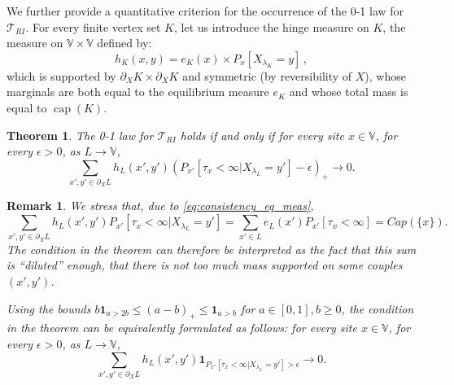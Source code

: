 \documentclass[12pt,a4paper]{article}
\newtheorem{theorem}[theo]{Theorem}
\newtheorem{remark}[theo]{Remark}
\newcommand{\1}[1]{{\mathbf 1}{\{#1\}}}
\newcommand{\8}{{\infty}}
\newcommand{\ind}{{\mathbf{1}}} %
\newcommand{\capa}{\mathop{\mathrm{cap}}}
\begin{document}
We further provide a quantitative criterion for the occurrence of the 0-1 law for $\mathcal{T}_{RI}$.
For every finite vertex set $K$, let us introduce the hinge measure on $K$, the measure on $\mathbb{V}\times \mathbb{V}$ defined by:
\begin{equation}\label{eq:def_hinge_meas}
h_K(x, y)= e_K(x) \times P_x[X_{\lambda_K}= y]\, ,
\end{equation}
which is supported by $\partial_X K \times \partial_X K$ and symmetric (by reversibility of $X$), whose marginals are both equal to the equilibrium measure $e_K$ and whose total mass is equal to $\capa(K)$.

\begin{theorem}\label{th:quantitative_criterion}
  The 0-1 law for $\mathcal{T}_{RI}$ holds if and only if for every site $x\in \mathbb{V}$, for every $\epsilon>0$, as $L\to \mathbb{V}$,
  \begin{equation}
    \sum_{x', y'\in \partial_X L} h_L(x', y') \left(P_{x'}[\tau_x < \infty | X_{\lambda_L}=y']-\epsilon \right)_+ \to 0.
  \end{equation}
\end{theorem}
\begin{remark}
We stress that, due to \eqref{eq:consistency_eq_meas},
\begin{equation}
    \sum_{x', y'\in \partial_X L} h_L(x', y') P_{x'}[\tau_x < \infty | X_{\lambda_L}=y']
    =  \sum_{x'\in L} e_L(x')  P_{x'}[\tau_x<\infty]
    = Cap(\{x\}).
  \end{equation}
The condition in the theorem can therefore be interpreted as the fact that this sum is ``diluted'' enough, that there is not too much mass supported on some couples $(x',y')$.  

Using the bounds $b \ind_{a > 2b} \le (a-b)_+ \le \ind_{a > b}$ for $a \in [0, 1], b \ge 0$, the condition in the theorem can be equivalently formulated as follows: for every site $x\in \mathbb{V}$, for every $\epsilon>0$, as $L\to \mathbb{V}$,
  \begin{equation}
    \sum_{x', y'\in \partial_X L} h_L(x', y') \ind_{P_{x'}[\tau_x < \infty | X_{\lambda_L}=y'] >\epsilon} \to 0.
  \end{equation}
\end{remark}
\end{document}
